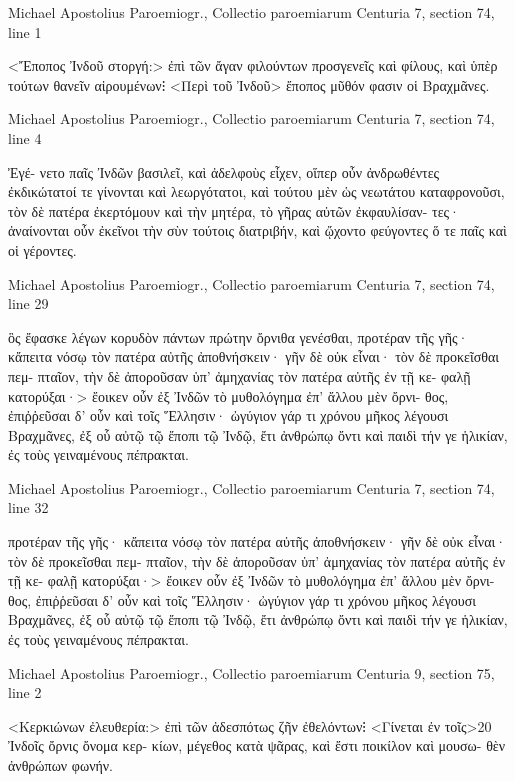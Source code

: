 \documentclass[12pt,letterpaper,twoside,final]{memoir}
\begin{document}
\begin{greek}
Michael Apostolius Paroemiogr., Collectio paroemiarum 
Centuria 7, section 74, line 1

<Ἔποπος Ἰνδοῦ στοργή:> ἐπὶ τῶν ἄγαν φιλούντων 
προσγενεῖς καὶ φίλους, καὶ ὑπὲρ τούτων θανεῖν αἱρουμένων⁝ 
<Περὶ τοῦ Ἰνδοῦ> ἔποπος μῦθόν φασιν οἱ Βραχμᾶνες. 



Michael Apostolius Paroemiogr., Collectio paroemiarum 
Centuria 7, section 74, line 4

                                                                   Ἐγέ-
νετο παῖς Ἰνδῶν βασιλεῖ, καὶ ἀδελφοὺς εἶχεν, οἵπερ οὖν 
ἀνδρωθέντες ἐκδικώτατοί τε γίνονται καὶ λεωργότατοι, καὶ 
τούτου μὲν ὡς νεωτάτου καταφρονοῦσι, τὸν δὲ πατέρα   
ἐκερτόμουν καὶ τὴν μητέρα, τὸ γῆρας αὐτῶν ἐκφαυλίσαν-
τες· ἀναίνονται οὖν ἐκεῖνοι τὴν σὺν τούτοις διατριβήν, 
καὶ ᾤχοντο φεύγοντες ὅ τε παῖς καὶ οἱ γέροντες. 



Michael Apostolius Paroemiogr., Collectio paroemiarum 
Centuria 7, section 74, line 29

ὃς ἔφασκε λέγων κορυδὸν πάντων πρώτην 
       ὄρνιθα γενέσθαι, 
 προτέραν τῆς γῆς· κἄπειτα νόσῳ τὸν πατέρα 
       αὐτῆς ἀποθνήσκειν· 
 γῆν δὲ οὐκ εἶναι· τὸν δὲ προκεῖσθαι πεμ-
       πταῖον, τὴν δὲ ἀποροῦσαν 
 ὑπ' ἀμηχανίας τὸν πατέρα αὐτῆς ἐν τῇ κε-
       φαλῇ κατορύξαι·> 
ἔοικεν οὖν ἐξ Ἰνδῶν τὸ μυθολόγημα ἐπ' ἄλλου μὲν ὄρνι-
θος, ἐπιῤῥεῦσαι δ' οὖν καὶ τοῖς Ἕλλησιν· ὠγύγιον γάρ τι 
χρόνου μῆκος λέγουσι Βραχμᾶνες, ἐξ οὗ αὐτῷ τῷ ἔποπι 
τῷ Ἰνδῷ, ἔτι ἀνθρώπῳ ὄντι καὶ παιδὶ τήν γε ἡλικίαν, ἐς 
τοὺς γειναμένους πέπρακται. 



Michael Apostolius Paroemiogr., Collectio paroemiarum 
Centuria 7, section 74, line 32

προτέραν τῆς γῆς· κἄπειτα νόσῳ τὸν πατέρα 
       αὐτῆς ἀποθνήσκειν· 
 γῆν δὲ οὐκ εἶναι· τὸν δὲ προκεῖσθαι πεμ-
       πταῖον, τὴν δὲ ἀποροῦσαν 
 ὑπ' ἀμηχανίας τὸν πατέρα αὐτῆς ἐν τῇ κε-
       φαλῇ κατορύξαι·> 
ἔοικεν οὖν ἐξ Ἰνδῶν τὸ μυθολόγημα ἐπ' ἄλλου μὲν ὄρνι-
θος, ἐπιῤῥεῦσαι δ' οὖν καὶ τοῖς Ἕλλησιν· ὠγύγιον γάρ τι 
χρόνου μῆκος λέγουσι Βραχμᾶνες, ἐξ οὗ αὐτῷ τῷ ἔποπι 
τῷ Ἰνδῷ, ἔτι ἀνθρώπῳ ὄντι καὶ παιδὶ τήν γε ἡλικίαν, ἐς 
τοὺς γειναμένους πέπρακται. 



Michael Apostolius Paroemiogr., Collectio paroemiarum 
Centuria 9, section 75, line 2

<Κερκιώνων ἐλευθερία:> ἐπὶ τῶν ἀδεσπότως ζῆν 
ἐθελόντων⁝ <Γίνεται ἐν τοῖς>20 Ἰνδοῖς ὄρνις ὄνομα κερ-
κίων, μέγεθος κατὰ ψᾶρας, καὶ ἔστι ποικίλον καὶ μουσω-
θὲν ἀνθρώπων φωνήν. 




\end{greek}
\end{document}
